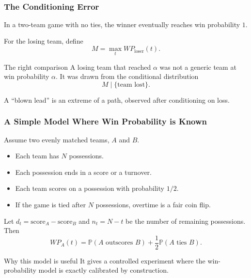 \documentclass[aspectratio=169,professionalfonts]{beamer}
\newcommand{\Prb}{\mathbb{P}}
\begin{document}
\begin{frame}
\frametitle{The Conditioning Error}
In a two-team game with no ties, the winner eventually reaches win probability $1$.

\vspace{2mm}
For the losing team, define
\[
  M = \max_t WP_{\text{loser}}(t).
\]

\begin{block}{The right comparison}
A losing team that reached $\alpha$ was not a generic team at win probability $\alpha$.
It was drawn from the conditional distribution
\[
  M \mid \{\text{team lost}\}.
\]
\end{block}

\vspace{2mm}
\centering
\Large
\alert{A ``blown lead'' is an extreme of a path, observed after conditioning on loss.}
\end{frame}



\begin{frame}
\frametitle{A Simple Model Where Win Probability is Known}
Assume two evenly matched teams, $A$ and $B$.
\begin{itemize}
  \item Each team has $N$ possessions.
  \item Each possession ends in a score or a turnover.
  \item Each team scores on a possession with probability $1/2$.
  \item If the game is tied after $N$ possessions, overtime is a fair coin flip.
\end{itemize}

Let $d_t=\text{score}_A-\text{score}_B$ and $n_t=N-t$ be the number of remaining possessions. Then
\[
WP_A(t)=\Prb(A\text{ outscores }B)+\frac12\Prb(A\text{ ties }B).
\]

\begin{block}{Why this model is useful}
It gives a controlled experiment where the win-probability model is exactly calibrated by construction.
\end{block}
\end{frame}
\end{document}
